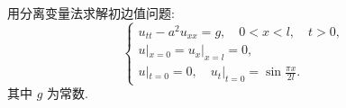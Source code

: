 

\begin{exercise}[4]
  用分离变量法求解初边值问题:
  \[\begin{cases}
    u_{tt} - a^2 u_{xx} = g,\quad 0<x<l,\quad t>0, \\
    u|_{x=0} = u_x|_{x=l} = 0, \\
    u|_{t=0} = 0,\quad u_t|_{t=0} =\sin\frac{\pi x}{2l}.
  \end{cases}\]
  其中 $g$ 为常数.
\end{exercise}

